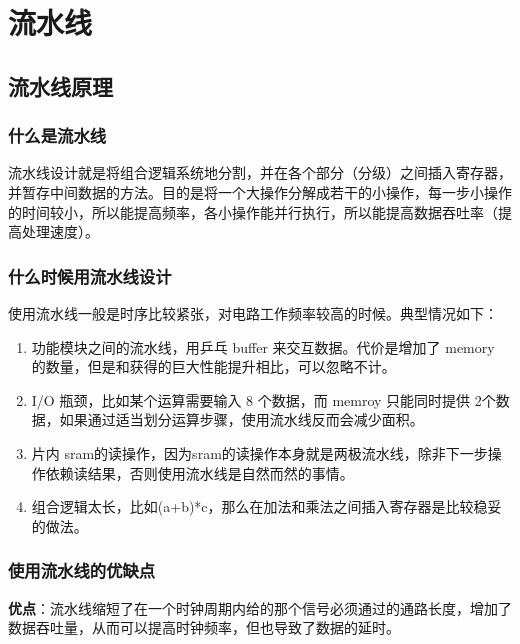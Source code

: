 \section{流水线}
\subsection{流水线原理}
\subsubsection{什么是流水线}
流水线设计就是将组合逻辑系统地分割，并在各个部分（分级）之间插入寄存器，并暂存中间数据的方法。目的是将一个大操作分解成若干的小操作，每一步小操作的时间较小，所以能提高频率，各小操作能并行执行，所以能提高数据吞吐率（提高处理速度）。

\subsubsection{什么时候用流水线设计}
使用流水线一般是时序比较紧张，对电路工作频率较高的时候。典型情况如下：
\begin{enumerate}
    \item 功能模块之间的流水线，用乒乓 buffer 来交互数据。代价是增加了 memory 的数量，但是和获得的巨大性能提升相比，可以忽略不计。
    \item I/O 瓶颈，比如某个运算需要输入 8 个数据，而 memroy 只能同时提供 2个数据，如果通过适当划分运算步骤，使用流水线反而会减少面积。
    \item 片内 sram的读操作，因为sram的读操作本身就是两极流水线，除非下一步操作依赖读结果，否则使用流水线是自然而然的事情。
    \item 组合逻辑太长，比如(a+b)*c，那么在加法和乘法之间插入寄存器是比较稳妥的做法。
\end{enumerate}

\subsubsection{使用流水线的优缺点}

\textbf{优点}：流水线缩短了在一个时钟周期内给的那个信号必须通过的通路长度，增加了数据吞吐量，从而可以提高时钟频率，但也导致了数据的延时。


